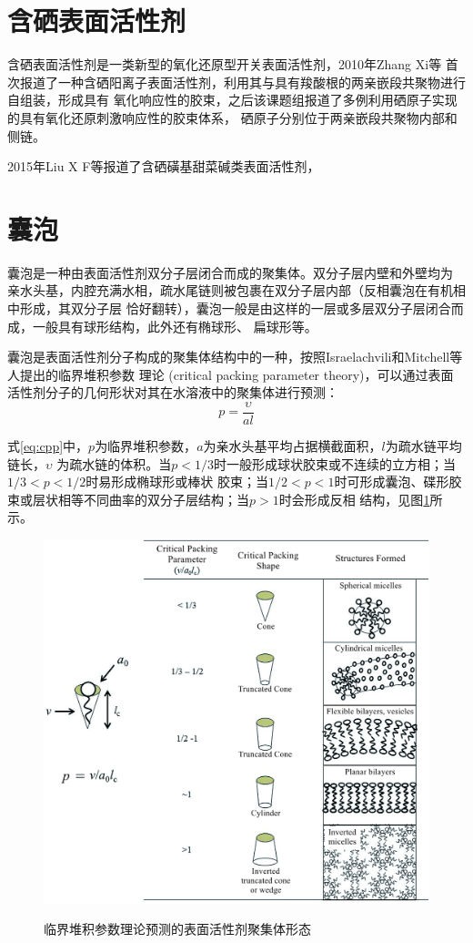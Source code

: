 \documentclass[bachelor,winfonts,replaceperiod]{jnuthesis}
\begin{document}
    \section{含硒表面活性剂}
    含硒表面活性剂是一类新型的氧化还原型开关表面活性剂，2010年Zhang Xi等\cite{zhangxi2010,zhangxi20102}
    首次报道了一种含硒阳离子表面活性剂，利用其与具有羧酸根的两亲嵌段共聚物进行自组装，形成具有
    氧化响应性的胶束，之后该课题组报道了多例利用硒原子实现的具有氧化还原刺激响应性的胶束体系，
    硒原子分别位于两亲嵌段共聚物内部和侧链。
    
    2015年Liu X F等\cite{zhang2015}报道了含硒磺基甜菜碱类表面活性剂，
    
    \section{囊泡}
    囊泡是一种由表面活性剂双分子层闭合而成的聚集体。双分子层内壁和外壁均为
    亲水头基，内腔充满水相，疏水尾链则被包裹在双分子层内部（反相囊泡在有机相中形成，其双分子层
    恰好翻转），囊泡一般是由这样的一层或多层双分子层闭合而成，一般具有球形结构，此外还有椭球形、
    扁球形等。
    
    囊泡是表面活性剂分子构成的聚集体结构中的一种，按照Israelachvili和Mitchell等人提出的临界堆积参数
    理论 (critical packing parameter theory)，可以通过表面活性剂分子的几何形状对其在水溶液中的聚集体进行预测：
    \begin{equation}\label{eq:cpp}
        p=\frac{\upsilon}{al}
    \end{equation}
    
    式\ref{eq:cpp}中，$p$为临界堆积参数，$a$为亲水头基平均占据横截面积，$l$为疏水链平均链长，$\upsilon$
    为疏水链的体积。当$p<1/3$时一般形成球状胶束或不连续的立方相；当$1/3<p<1/2$时易形成椭球形或棒状
    胶束；当$1/2<p<1$时可形成囊泡、碟形胶束或层状相等不同曲率的双分子层结构；当$p>1$时会形成反相
    结构，见图\ref{fig:scheme-cpp}所示。
    \begin{figure}[htbp]
        \centering
        \includegraphics[width= .826\textwidth]{figure/scheme-cpp.png}\\
        \caption{临界堆积参数理论预测的表面活性剂聚集体形态\cite{salim2014}}\label{fig:scheme-cpp}
    \end{figure}
\end{document}
